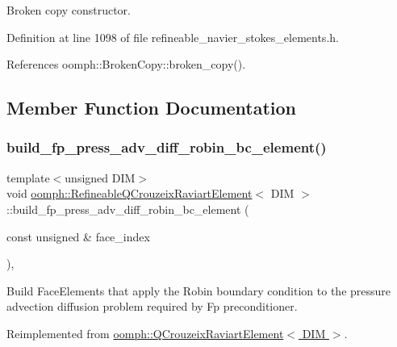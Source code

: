 Broken copy constructor. 



Definition at line 1098 of file refineable\+\_\+navier\+\_\+stokes\+\_\+elements.\+h.



References oomph\+::\+Broken\+Copy\+::broken\+\_\+copy().



\subsection{Member Function Documentation}
\mbox{\label{classoomph_1_1RefineableQCrouzeixRaviartElement_a734c84a54196ba141791e7471d7c3c7d}} 
\subsubsection{\texorpdfstring{build\+\_\+fp\+\_\+press\+\_\+adv\+\_\+diff\+\_\+robin\+\_\+bc\+\_\+element()}{build\_fp\_press\_adv\_diff\_robin\_bc\_element()}}
{\footnotesize\ttfamily template$<$unsigned D\+IM$>$ \\
void \hyperlink{classoomph_1_1RefineableQCrouzeixRaviartElement}{oomph\+::\+Refineable\+Q\+Crouzeix\+Raviart\+Element}$<$ D\+IM $>$\+::build\+\_\+fp\+\_\+press\+\_\+adv\+\_\+diff\+\_\+robin\+\_\+bc\+\_\+element (\begin{DoxyParamCaption}\item[{const unsigned \&}]{face\+\_\+index }\end{DoxyParamCaption})\hspace{0.3cm}{\ttfamily [inline]}, {\ttfamily [virtual]}}



Build Face\+Elements that apply the Robin boundary condition to the pressure advection diffusion problem required by Fp preconditioner. 



Reimplemented from \hyperlink{classoomph_1_1QCrouzeixRaviartElement_a5b824083683ead3f8bead4061bce21f1}{oomph\+::\+Q\+Crouzeix\+Raviart\+Element$<$ D\+I\+M $>$}.



